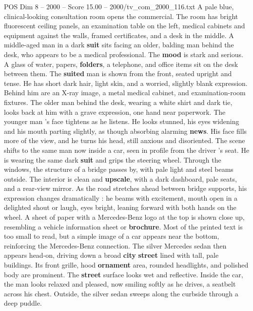 \begin{textsample}{POS Dim 8 – 2000 – Score 15.00 – 2000/tv\_com\_2000\_116.txt}  \label{ex:f8_pos_002}
A pale blue, clinical-looking consultation room opens the commercial.
The room has bright fluorescent ceiling panels, an examination table on the left, medical cabinets and equipment against the walls, framed certificates, and a desk in the middle.
A middle-aged man in a dark \textbf{suit} sits facing an older, balding man behind the desk, who appears to be a medical professional.
The \textbf{mood} is stark and serious.
A glass of water, papers, \textbf{folders}, a telephone, and office items sit on the desk between them.
The \textbf{suited} man is shown from the front, seated upright and tense.
He has short dark hair, light skin, and a worried, slightly blank expression.
Behind him are an X-ray image, a metal medical cabinet, and examination-room fixtures.
The older man behind the desk, wearing a white shirt and dark tie, looks back at him with a grave expression, one hand near paperwork.
The younger man ’s face tightens as he listens.
He looks stunned, his eyes widening and his mouth parting slightly, as though absorbing alarming \textbf{news}.
His face fills more of the view, and he turns his head, still anxious and disoriented.
The scene shifts to the same man now inside a car, seen in profile from the driver ’s seat.
He is wearing the same dark \textbf{suit} and grips the steering wheel.
Through the windows, the structure of a bridge passes by, with pale light and steel beams outside.
The interior is clean and \textbf{upscale}, with a dark dashboard, pale seats, and a rear-view mirror.
As the road stretches ahead between bridge supports, his expression changes dramatically : he beams with excitement, mouth open in a delighted shout or laugh, eyes bright, leaning forward with both hands on the wheel.
A sheet of paper with a Mercedes-Benz logo at the top is shown close up, resembling a vehicle information sheet or \textbf{brochure}.
Most of the printed text is too small to read, but a simple image of a car appears near the bottom, reinforcing the Mercedes-Benz connection.
The silver Mercedes sedan then appears head-on, driving down a broad \textbf{city} \textbf{street} lined with tall, pale buildings.
Its front grille, hood \textbf{ornament} area, rounded headlights, and polished body are prominent.
The \textbf{street} surface looks wet and reflective.
Inside the car, the man looks relaxed and pleased, now smiling softly as he drives, a seatbelt across his chest.
Outside, the silver sedan sweeps along the curbside through a deep puddle.

\end{textsample}
